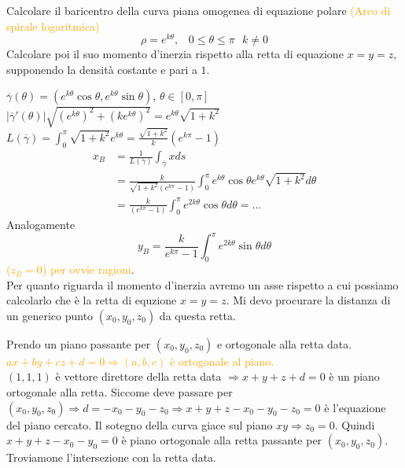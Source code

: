 \begin{exbar}
\begin{example}
	Calcolare il baricentro della curva piana omogenea di equazione polare \textcolor{orange}{(Arco di spirale logaritmica)}
	\begin{equation*}
		\rho=e^{k\theta}, \,\,\,\, \, 0 \leq \theta \leq \pi\,\,\,\, k \neq 0
	\end{equation*}
	Calcolare poi il suo momento d'inerzia rispetto alla retta di equazione $x=y=z$, supponendo la densità costante e pari a $1$.\\
	
	\segnaposto %
	
	$\overline{\gamma}(\theta)=(e^{k\theta}\cos \theta, e^{k\theta}\sin \theta)$, $\theta \in [0,\pi]$\\
	$|\overline{\gamma}'(\theta)|\sqrt{(e^{k\theta})^2+(ke^{k\theta})^2}=e^{k\theta}\sqrt{1+k^2}$\\
	$L(\overline{\gamma})=\int_0^{\pi} \sqrt{1+k^2}e^{k\theta}=\frac{\sqrt{1+k^2}}{k}(e^{k\pi}-1)$
	\begin{align*}
		x_B&=\frac{1}{L(\overline{\gamma})}\int_{\overline{\gamma}} x ds\\
		&= \frac{k}{\sqrt{1+k^2}(e^{k\pi}-1)}\int_0^\pi e^{k\theta} \cos \theta e^{k\theta}\sqrt{1+k^2}d\theta\\
		&=\frac{k}{(e^{k\pi}-1)}\int_0^\pi e^{2k\theta} \cos \theta d \theta=...
	\end{align*}
	Analogamente
	\begin{equation*}
		y_B= \frac{k}{e^{k\pi}-1}\int_0^\pi e^{2k \theta} \sin \theta d \theta
	\end{equation*}
	\textcolor{orange}{($z_B=0$) per ovvie ragioni}.\\
	Per quanto riguarda il momento d'inerzia avremo un asse rispetto a cui possiamo calcolarlo che è la retta di equzione $x=y=z$. Mi devo procurare la distanza di un generico punto $(x_0,y_0,z_0)$ da questa retta.\\

	\segnaposto %

	Prendo un piano passante per $(x_0,y_0,z_0)$ e ortogonale alla retta data. \\
	\textcolor{orange}{$ax+by+cz+d=0 \Rightarrow (a,b,c)$ è ortogonale al piano.}\\
	$(1,1,1)$ è vettore direttore della retta data $\Rightarrow x+y+z+d=0$ è un piano ortogonale alla retta. Siccome deve passare per $(x_0,y_0,z_0) \Rightarrow d= -x_0-y_0-z_0 \Rightarrow x+y+z-x_0-y_0-z_0=0$ è l'equazione del piano cercato. Il sotegno della curva giace sul piano $xy \Rightarrow z_0=0$. Quindi $x+y+z-x_0-y_0=0$ è piano ortogonale alla retta passante per $(x_0,y_0,z_0)$. Troviamone l'intersezione con la retta data. \\
	

\end{example}
\end{exbar}
